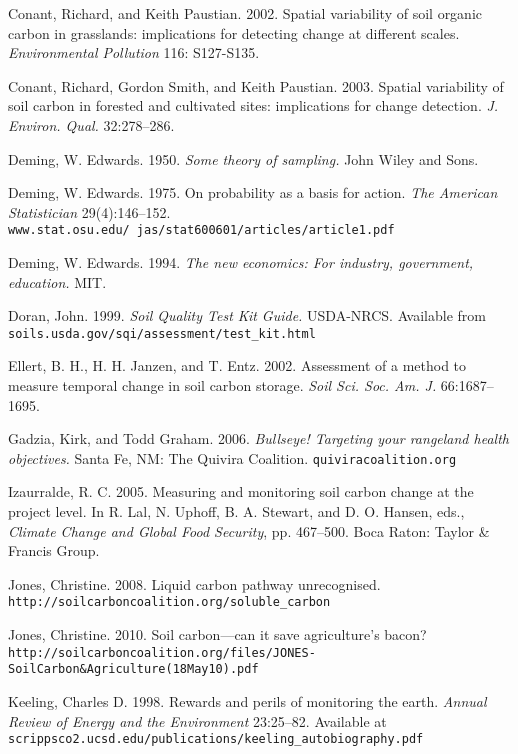 \documentclass[11pt,letterpaper,oneside,onecolumn]{memoir}
\begin{document}
\setlength{\parindent}{0em}
\setlength{\parskip}{.6em}
\begin{flushleft}
\small
\linespread{1.0}

Conant, Richard, and Keith Paustian. 2002. Spatial variability of soil organic carbon in grasslands: implications for detecting change at different scales. \textit{Environmental Pollution} 116: S127-S135.

Conant, Richard, Gordon Smith, and Keith Paustian. 2003. Spatial variability of soil carbon in forested and cultivated sites: implications for change detection. \textit{J. Environ. Qual.} 32:278--286.

Deming, W. Edwards. 1950. \textit{Some theory of sampling.} John Wiley and Sons.

Deming, W. Edwards. 1975. On probability as a basis for action. \textit{The American Statistician} 29(4):146--152. \texttt{www.stat.osu.edu/~jas/stat600601/articles/article1.pdf}

Deming, W. Edwards. 1994. \textit{The new economics: For industry, government, education.} MIT.

Doran, John. 1999. \textit{Soil Quality Test Kit Guide.} USDA-NRCS. Available from \texttt{soils.usda.gov/sqi/assessment/test\_kit.html}

Ellert, B. H., H. H. Janzen, and T. Entz. 2002. Assessment of a method to measure temporal change in soil carbon storage. \textit{Soil Sci. Soc. Am. J.} 66:1687--1695.

Gadzia, Kirk, and Todd Graham. 2006. \textit{Bullseye! Targeting your rangeland health objectives.} Santa Fe, NM: The Quivira Coalition. \texttt{quiviracoalition.org}

Izaurralde, R. C. 2005. Measuring and monitoring soil carbon change at the project level. In R. Lal, N. Uphoff, B. A. Stewart, and D. O. Hansen, eds., \textit{Climate Change and Global Food Security}, pp. 467--500. Boca Raton: Taylor \& Francis Group.

Jones, Christine. 2008. Liquid carbon pathway unrecognised. \texttt{http://soilcarboncoalition.org/soluble\_carbon}

Jones, Christine. 2010. Soil carbon---can it save agriculture's bacon? \texttt{http://soilcarboncoalition.org/files/JONES-SoilCarbon\&Agriculture(18May10).pdf}

Keeling, Charles D. 1998. Rewards and perils of monitoring the earth. \textit{Annual Review of Energy and the Environment} 23:25--82. Available at \texttt{scrippsco2.ucsd.edu/publications/keeling\_autobiography.pdf}


\end{flushleft}
\end{document}

